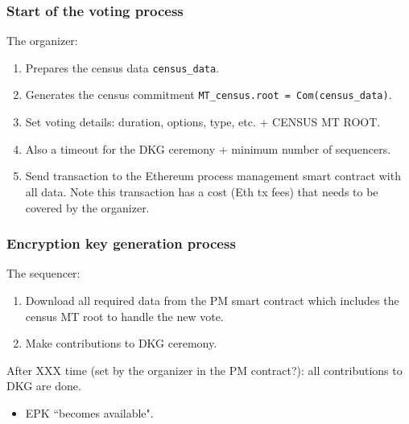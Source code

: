 \subsubsection{Start of the voting process}
\label{sec:vocdoni-protocol:start}

The organizer:
\begin{enumerate}
	\item Prepares the census data \texttt{census\_data}.
	\item Generates the census commitment \texttt{MT\_census.root = Com(census\_data)}.
	\item Set voting details: duration, options, type, etc. + CENSUS MT ROOT.
	\item Also a timeout for the DKG ceremony + minimum number of sequencers.
	\item Send transaction to the Ethereum process management smart contract with all data. Note this transaction has a cost (Eth tx fees) that needs to be covered by the organizer.
\end{enumerate}

\subsubsection{Encryption key generation process} %
\label{sec:vocdoni-protocol:dkg}

The sequencer:
\begin{enumerate}
	\item Download all required data from the PM smart contract which includes the census MT root to handle the new vote.
	\item Make contributions to DKG ceremony.
\end{enumerate}

After XXX time (set by the organizer in the PM contract?): all contributions to DKG are done.

	
\begin{itemize}
	\item EPK ``becomes available".
\end{itemize}

